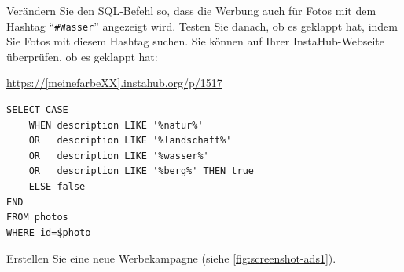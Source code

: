 \begin{myexercise}
  Verändern Sie den SQL-Befehl so, dass die Werbung auch für Fotos mit dem Hashtag \enquote{\texttt{\#Wasser}} angezeigt wird. Testen Sie danach, ob es geklappt hat, indem Sie Fotos mit diesem Hashtag suchen. Sie können auf Ihrer InstaHub-Webseite überprüfen, ob es geklappt hat:

  \url{https://[meinefarbeXX].instahub.org/p/1517}

  \begin{myanswer}
    \begin{lstlisting}
SELECT CASE
	WHEN description LIKE '%natur%'
	OR   description LIKE '%landschaft%'
	OR   description LIKE '%wasser%'
	OR   description LIKE '%berg%' THEN true
	ELSE false
END
FROM photos
WHERE id=$photo
\end{lstlisting}
  \end{myanswer}
\end{myexercise}

\begin{mychallenge}
  Erstellen Sie eine neue Werbekampagne (siehe \cref{fig:screenshot-ads1}).
\end{mychallenge}

